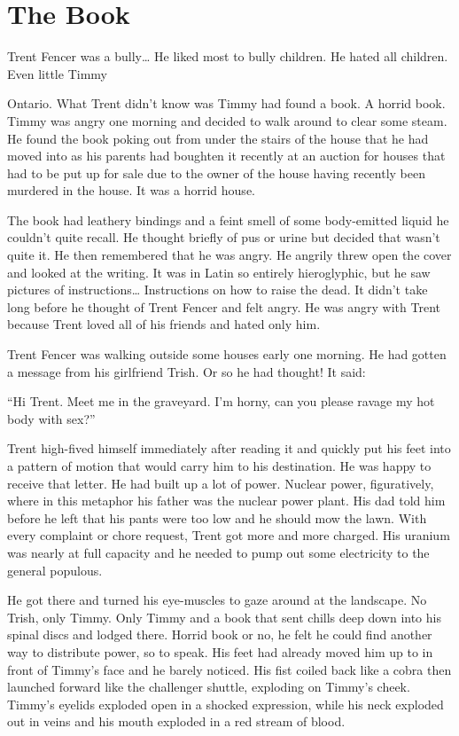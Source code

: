 \chapter{The Book}


Trent Fencer was a bully{\ldots} He liked most to bully children. He
hated all children. Even little Timmy

Ontario. What Trent didn't know was Timmy had found a book. A
horrid book. Timmy was angry one morning and decided to walk around
to clear some steam. He found the book poking out from under the
stairs of the house that he had moved into as his parents had
boughten it recently at an auction for houses that had to be put up
for sale due to the owner of the house having recently been
murdered in the house. It was a horrid house.



The book had leathery bindings and a feint smell of some
body-emitted liquid he couldn't quite recall. He thought briefly of
pus or urine but decided that wasn't quite it. He then remembered
that he was angry. He angrily threw open the cover and looked at
the writing. It was in Latin so entirely hieroglyphic, but he saw
pictures of instructions{\ldots} Instructions on how to raise the dead.
It didn't take long before he thought of Trent Fencer and felt
angry. He was angry with Trent because Trent loved all of his
friends and hated only him.



Trent Fencer was walking outside some houses early one morning. He
had gotten a message from his girlfriend Trish. Or so he had
thought! It said:



``Hi Trent. Meet me in the graveyard. I'm horny, can you please
ravage my hot body with sex?''



Trent high-fived himself immediately after reading it and quickly
put his feet into a pattern of motion that would carry him to his
destination. He was happy to receive that letter. He had built up a
lot of power. Nuclear power, figuratively, where in this metaphor
his father was the nuclear power plant. His dad told him before he
left that his pants were too low and he should mow the lawn. With
every complaint or chore request, Trent got more and more charged.
His uranium was nearly at full capacity and he needed to pump out
some electricity to the general populous.



He got there and turned his eye-muscles to gaze around at the
landscape. No Trish, only Timmy. Only Timmy and a book that sent
chills deep down into his spinal discs and lodged there. Horrid
book or no, he felt he could find another way to distribute power,
so to speak. His feet had already moved him up to in front of
Timmy's face and he barely noticed. His fist coiled back like a
cobra then launched forward like the challenger shuttle, exploding
on Timmy's cheek. Timmy's eyelids exploded open in a shocked
expression, while his neck exploded out in veins and his mouth
exploded in a red stream of blood.



